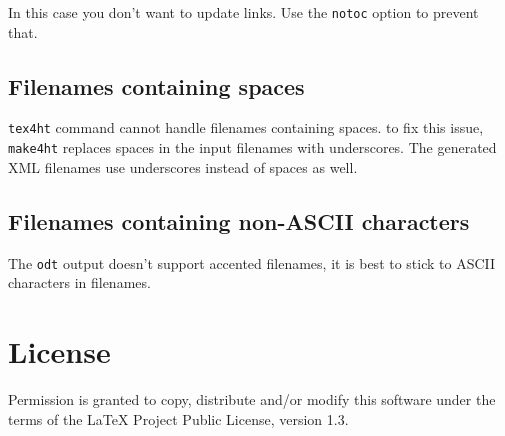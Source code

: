 In this case you don't want to update links. Use the \texttt{notoc}
option to prevent that.

\subsection{Filenames containing
spaces}\label{filenames-containing-spaces}

\texttt{tex4ht} command cannot handle filenames containing spaces. to
fix this issue, \texttt{make4ht} replaces spaces in the input filenames
with underscores. The generated XML filenames use underscores instead of
spaces as well.

\subsection{Filenames containing non-ASCII
characters}\label{filenames-containing-non-ascii-characters}

The \texttt{odt} output doesn't support accented filenames, it is best
to stick to ASCII characters in filenames.

\section{License}\label{license}

Permission is granted to copy, distribute and/or modify this software
under the terms of the LaTeX Project Public License, version 1.3.
